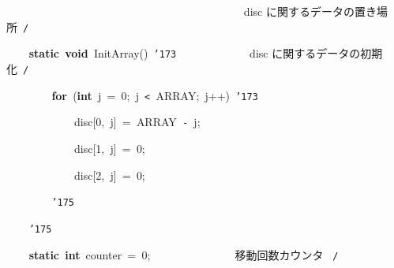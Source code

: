 \documentclass[a4paper,10pt]{article}
\def\mc{\relax}
\begin{document}
\noindent
\mbox{}{\tt\mc \ }{\tt\mc \ }{\tt\mc \ }{\tt\mc \ }{\tt\mc \ }{\tt\mc \ }{\tt\mc \ }{\tt\mc \ }{\tt\mc \ }{\tt\mc \ }{\tt\mc \ }{\tt\mc \ }{\tt\mc \ }{\tt\mc \ }{\tt\mc \ }{\tt\mc \ }{\tt\mc \ }{\tt\mc \ }{\tt\mc \ }{\tt\mc \ }{\tt\mc \ }{\tt\mc \ }{\tt\mc \ }{\tt\mc \ }{\tt\mc \ }{\tt\mc \ }{\tt\mc \ }{\tt\mc \ }{\tt\mc \ }{\tt\mc \ }{\tt\mc \ }{\tt\mc \ }{\tt\mc \ }{\tt\mc \ }{\tt\mc \ }{\tt\mc \ }{\tt\mc \ }{\tt\mc \ }{\tt\mc \ }{\tt\mc \ }\rm\mc {\tt /}{\tt *}\  \ disc に関するデータの置き場所\hfill \rm\mc \ {\tt *}{\tt /}
\tt\mc 

\noindent
\mbox{}\hfill

\noindent
\mbox{}{\tt\mc \ }{\tt\mc \ }{\tt\mc \ }{\tt\mc \ }\textbf{static}{\tt\mc \ }\textbf{void}{\tt\mc \ }InitArray(){\tt\mc \ }{\tt\char'173}{\tt\mc \ }{\tt\mc \ }{\tt\mc \ }{\tt\mc \ }{\tt\mc \ }{\tt\mc \ }{\tt\mc \ }{\tt\mc \ }{\tt\mc \ }{\tt\mc \ }{\tt\mc \ }\rm\mc {\tt /}{\tt *}\  \ disc に関するデータの初期化\hfill \rm\mc \ {\tt *}{\tt /}
\tt\mc 

\noindent
\mbox{}{\tt\mc \ }{\tt\mc \ }{\tt\mc \ }{\tt\mc \ }{\tt\mc \ }{\tt\mc \ }{\tt\mc \ }{\tt\mc \ }\textbf{for}{\tt\mc \ }(\textbf{int}{\tt\mc \ }j{\tt\mc \ }={\tt\mc \ }0;{\tt\mc \ }j{\tt\mc \ }{\tt <}{\tt\mc \ }ARRAY;{\tt\mc \ }j++){\tt\mc \ }{\tt\char'173}

\noindent
\mbox{}{\tt\mc \ }{\tt\mc \ }{\tt\mc \ }{\tt\mc \ }{\tt\mc \ }{\tt\mc \ }{\tt\mc \ }{\tt\mc \ }{\tt\mc \ }{\tt\mc \ }{\tt\mc \ }{\tt\mc \ }disc[0,{\tt\mc \ }j]{\tt\mc \ }={\tt\mc \ }ARRAY{\tt\mc \ }{\tt -}{\tt\mc \ }j;

\noindent
\mbox{}{\tt\mc \ }{\tt\mc \ }{\tt\mc \ }{\tt\mc \ }{\tt\mc \ }{\tt\mc \ }{\tt\mc \ }{\tt\mc \ }{\tt\mc \ }{\tt\mc \ }{\tt\mc \ }{\tt\mc \ }disc[1,{\tt\mc \ }j]{\tt\mc \ }={\tt\mc \ }0;

\noindent
\mbox{}{\tt\mc \ }{\tt\mc \ }{\tt\mc \ }{\tt\mc \ }{\tt\mc \ }{\tt\mc \ }{\tt\mc \ }{\tt\mc \ }{\tt\mc \ }{\tt\mc \ }{\tt\mc \ }{\tt\mc \ }disc[2,{\tt\mc \ }j]{\tt\mc \ }={\tt\mc \ }0;

\noindent
\mbox{}{\tt\mc \ }{\tt\mc \ }{\tt\mc \ }{\tt\mc \ }{\tt\mc \ }{\tt\mc \ }{\tt\mc \ }{\tt\mc \ }{\tt\char'175}

\noindent
\mbox{}{\tt\mc \ }{\tt\mc \ }{\tt\mc \ }{\tt\mc \ }{\tt\char'175}

\noindent
\mbox{}\hfill

\noindent
\mbox{}{\tt\mc \ }{\tt\mc \ }{\tt\mc \ }{\tt\mc \ }\textbf{static}{\tt\mc \ }\textbf{int}{\tt\mc \ }counter{\tt\mc \ }={\tt\mc \ }0;{\tt\mc \ }{\tt\mc \ }{\tt\mc \ }{\tt\mc \ }{\tt\mc \ }{\tt\mc \ }{\tt\mc \ }{\tt\mc \ }{\tt\mc \ }{\tt\mc \ }{\tt\mc \ }{\tt\mc \ }{\tt\mc \ }\rm\mc {\tt /}{\tt *}\  \ 移動回数カウンタ \hfill \rm\mc \ {\tt *}{\tt /}
\tt\mc 
\end{document}
